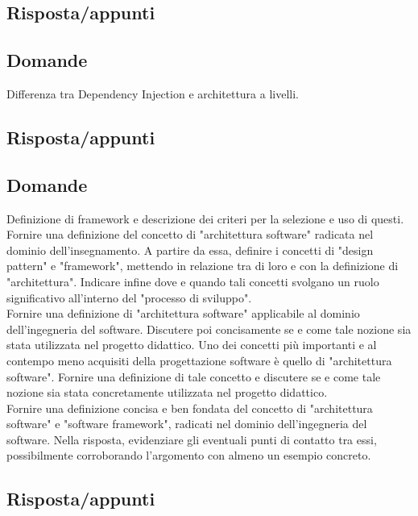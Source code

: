 \subsection*{Risposta/appunti}

\subsection*{Domande}
Differenza tra Dependency Injection e architettura a livelli.

\subsection*{Risposta/appunti}

\subsection*{Domande}
Definizione di framework e descrizione dei criteri per la selezione e uso di questi.\\

Fornire una definizione del concetto di "architettura software" radicata nel dominio dell'insegnamento. 
A partire da essa, definire i concetti di "design pattern" e "framework", mettendo in relazione tra di loro e con la definizione di "architettura". 
Indicare infine dove e quando tali concetti svolgano un ruolo significativo all'interno del "processo di sviluppo".\\

Fornire una definizione di "architettura software" applicabile al dominio dell'ingegneria del software. 
Discutere poi concisamente se e come tale nozione sia stata utilizzata nel progetto didattico.
Uno dei concetti più importanti e al contempo meno acquisiti della progettazione software è quello di "architettura software". 
Fornire una definizione di tale concetto e discutere se e come tale nozione sia stata concretamente utilizzata nel progetto didattico.\\

Fornire una definizione concisa e ben fondata del concetto di "architettura software" e "software framework", radicati nel dominio dell'ingegneria del software.
Nella risposta, evidenziare gli eventuali punti di contatto tra essi, possibilmente corroborando l'argomento con almeno un esempio concreto.

\subsection*{Risposta/appunti}

